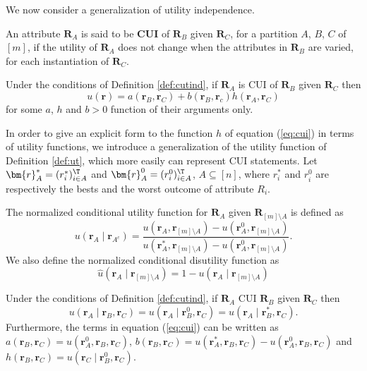 We now consider a generalization of utility independence.
\begin{definition}
\label{def:cutind}
An attribute $\bm{R}_A$ is said to be \textbf{\gls{CUI}} of $\bm{R}_B$ given $\bm{R}_C$, for a partition $A$, $B$, $C$ of $[m]$, if the utility of $\bm{R}_A$ does not change when the attributes in $\bm{R}_B$ are varied, for each instantiation of $\bm{R}_C$.
\end{definition}


\begin{proposition}
Under the conditions of Definition \ref{def:cutind}, if $\bm{R}_A$ is \gls{CUI} of $\bm{R}_B$ given $\bm{R}_C$ then
\begin{equation}
u(\bm{r})=a(\bm{r}_B,\bm{r}_C)+b(\bm{r}_B,\bm{r}_c)h(\bm{r}_A,\bm{r}_C)
\label{eq:cui}
\end{equation}
for some $a$, $h$ and $b>0$ function of their arguments only. 
\end{proposition}

In order to give an explicit form to the function $h$ of equation (\ref{eq:cui}) in terms of utility functions, we introduce a generalization of the utility function of Definition \ref{def:ut}, which more easily can represent \gls{CUI} statements. Let $\bm{r}_A^{*}=(r_i^{*})^\T_{i\in A}$ and $\bm{r}_A^0=(r_i^0)^\T_{i\in A}$, $A\subseteq [n]$, where $r_i^*$ and $r_i^0$ are respectively the bests and the worst outcome of attribute $R_i$. 

\begin{definition}
\label{def:cui}
The normalized conditional utility function for $\bm{R}_A$ given $\bm{R}_{[m]\setminus A}$ is defined as
\begin{equation*}
u(\bm{r}_A\;|\; \bm{r}_{A^c})=\frac{u(\bm{r}_A,\bm{r}_{[m]\setminus A})-u(\bm{r}_A^0,\bm{r}_{[m]\setminus A})}{u(\bm{r}_A^*,\bm{r}_{[m]\setminus A})-u(\bm{r}_A^0,\bm{r}_{[m]\setminus A})}.
\end{equation*}
We also define the normalized conditional disutility function as
\begin{equation*}
\hat{u}(\bm{r}_A\;|\;\bm{r}_{[m]\setminus A})=1-u(\bm{r}_A\;|\;\bm{r}_{[m]\setminus A})
\end{equation*}
\end{definition}

\begin{proposition}
Under the conditions of Definition \ref{def:cutind}, if $\bm{R}_A$ \gls{CUI} $\bm{R}_B$ given $\bm{R}_C$ then
\begin{equation*}
u(\bm{r}_A\;|\; \bm{r}_B,\bm{r}_C)=u(\bm{r}_A\;|\; \bm{r}_B^0,\bm{r}_C)=u(\bm{r}_A\;|\; \bm{r}_B^{*},\bm{r}_C).
\end{equation*}
Furthermore, the terms in equation (\ref{eq:cui}) can be written as 
$
a(\bm{r}_B,\bm{r}_C)=u(\bm{r}_A^0,\bm{r}_B,\bm{r}_C)$, $b(\bm{r}_B,\bm{r}_C)=u(\bm{r}_A^*,\bm{r}_B,\bm{r}_C)-u(\bm{r}_A^0,\bm{r}_B,\bm{r}_C)$ and $h(\bm{r}_B,\bm{r}_C)=u(\bm{r}_C\;|\;\bm{r}_B^0,\bm{r}_C)$.
\end{proposition}

